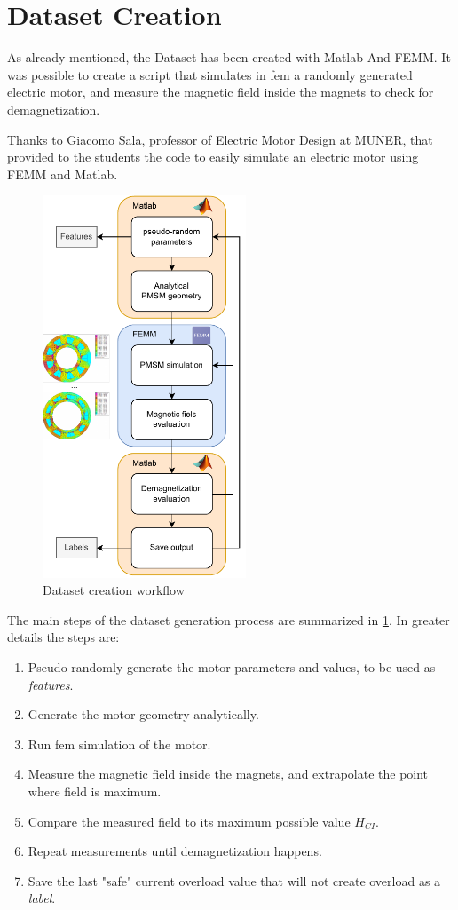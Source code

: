 \section{Dataset Creation}
As already mentioned, the Dataset has been created with Matlab And FEMM. It was possible to create a script that simulates in \gls{fem} a randomly generated electric motor, and measure the magnetic field inside the magnets to check for demagnetization.

Thanks to Giacomo Sala, professor of Electric Motor Design at MUNER\cite{MUNER}, that provided to the students the code to easily simulate an electric motor using FEMM and Matlab.
\begin{figure}[H]
    \centering
    \includegraphics[width=0.54\textwidth]{sections/images/section2/dataset_creation.pdf}
    \caption{Dataset creation workflow}
    \label{fig:dataset_creation}
\end{figure}
The main steps of the dataset generation process are summarized in \cref{fig:dataset_creation}. In greater details the steps are:
\begin{enumerate}\label{tab:dataset_creation}
    \item Pseudo randomly generate the motor parameters and values, to be used as \emph{features}.
    \item Generate the motor geometry analytically.
    \item Run \gls{fem} simulation of the motor.
    \item Measure the magnetic field inside the magnets, and extrapolate the point where field is maximum.
    \item Compare the measured field to its maximum possible value $H_{CI}$.
    \item Repeat measurements until demagnetization happens.
    \item Save the last "safe" current overload value that will not create overload as a \emph{label}.
\end{enumerate}

